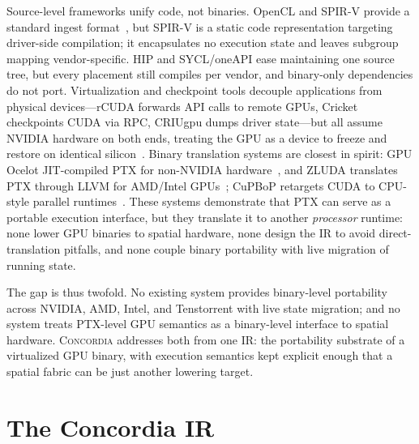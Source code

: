 \documentclass[sigplan,nonacm]{acmart}
\newcommand{\sys}{\textsc{Concordia}\xspace}
\begin{document}
Source-level frameworks unify code, not binaries.  OpenCL and SPIR-V provide
a standard ingest format~\cite{spirv}, but SPIR-V is a static code
representation
targeting driver-side compilation; it encapsulates no execution state and
leaves subgroup mapping vendor-specific.  HIP and SYCL/oneAPI ease
maintaining one source tree, but every placement still compiles per vendor,
and binary-only dependencies do not port.  Virtualization and checkpoint
tools decouple applications from physical devices---rCUDA forwards API calls
to remote GPUs, Cricket checkpoints CUDA via RPC, CRIUgpu dumps driver
state---but all assume NVIDIA hardware on both ends, treating the GPU as a
device to freeze and restore on identical silicon~\cite{kato2012gdev}.
Binary translation systems are closest in spirit: GPU Ocelot JIT-compiled
PTX for non-NVIDIA hardware~\cite{diamos2010ocelot}, and ZLUDA translates
PTX through LLVM for AMD/Intel GPUs~\cite{zluda}; CuPBoP retargets CUDA to
CPU-style parallel runtimes~\cite{huang2023cupbop}.  These systems
demonstrate that PTX can serve as a portable execution interface, but they
translate it to another \emph{processor} runtime: none lower GPU binaries to
spatial hardware, none design the IR to avoid direct-translation pitfalls,
and none couple binary portability with live migration of running state.

The gap is thus twofold.  No existing system provides binary-level
portability across NVIDIA, AMD, Intel, and Tenstorrent with live state
migration; and no system treats PTX-level GPU semantics as a binary-level
interface to spatial hardware.  \sys addresses both from one IR: the
portability substrate of a virtualized GPU binary, with execution semantics
kept explicit enough that a spatial fabric can be just another lowering
target.


\section{The Concordia IR}
\label{sec:ir}
\end{document}
